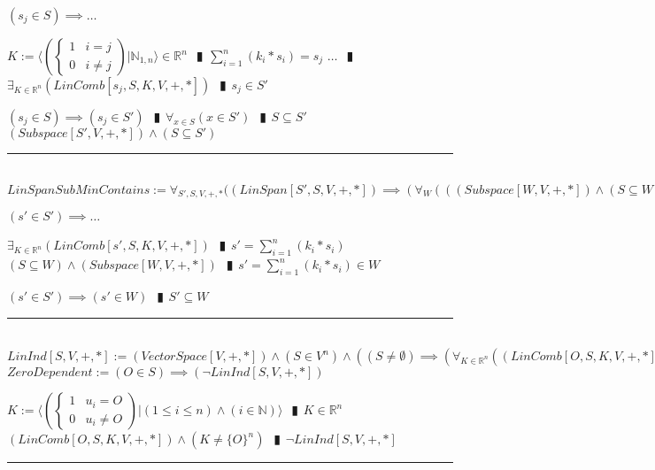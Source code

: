 \documentclass{book}
\newcommand{\abr}{:=}
\newcommand{\pipe}{$\phantom{(}\vrectangleblack\phantom{)}$}
\begin{document}
\begin{enumerate}
  \lit $(s_j \in S) \implies \ldots$
  \begin{enumerate}
    \lit $K \abr \langle \left(\begin{cases} 
      1 & i = j \\
      0 & i \neq j 
    \end{cases}\right) | \mathbb{N}_{1, n} \rangle \in \mathbb{R}^n$ \pipe $\sum_{i = 1}^{n}(k_i * s_i) = s_j$
    \lit $\ldots$ \pipe $\exists_{K \in \mathbb{R}^n}(LinComb[s_j, S, K, V, +, *])$ \pipe $s_j \in S'$
  \end{enumerate}
  \lit $(s_j \in S) \implies (s_j \in S')$ \pipe $\forall_{x \in S}(x \in S')$ \pipe $S \subseteq S'$
  \lit $(Subspace[S', V, +, *]) \land (S \subseteq S')$
\end{enumerate} \vspace{.75mm} \hrule \vspace{.75mm} \ \\ 

$LinSpanSubMinContains \abr \forall_{S', S, V, +, *}((LinSpan[S', S, V, +, *]) \implies (\forall_{W}(((Subspace[W, V, + ,*]) \land (S \subseteq W)) \implies (S' \subseteq W)))$
\begin{enumerate}
  \lit $(s' \in S') \implies \ldots$
  \begin{enumerate}
    \lit $\exists_{K \in \mathbb{R}^n}(LinComb[s', S, K, V, +, *])$ \pipe $s' = \sum_{i = 1}^{n}(k_i * s_i)$
    \lit $(S \subseteq W) \land (Subspace[W, V, + ,*])$ \pipe $s' = \sum_{i = 1}^{n}(k_i * s_i) \in W$
  \end{enumerate}
  \lit $(s' \in S') \implies (s' \in W)$ \pipe $S' \subseteq W$
\end{enumerate} \vspace{.75mm} \hrule \vspace{.75mm} \ \\ 

$LinInd[S, V, +, *] \abr (VectorSpace[V, +, *]) \land (S \in V^n) \land ((S \neq \emptyset) \implies (\forall_{K \in \mathbb{R}^n}((LinComb[O, S, K, V, +, *]) \implies (K = \{0\}^n))))$ \\

$ZeroDependent \abr (O \in S) \implies (\lnot LinInd[S, V, +, *])$
\begin{enumerate}
  \lit $K \abr \langle \left(\begin{cases} 
      1 & u_i = O \\
      0 & u_i \neq O 
    \end{cases}\right) | (1 \leq i \leq n) \land (i \in \mathbb{N}) \rangle$ \pipe $K \in \mathbb{R}^n$
  \lit $(LinComb[O, S, K, V, +, *]) \land (K \neq \{O\}^n)$ \pipe $\lnot LinInd[S, V, +, *]$
\end{enumerate} \vspace{.75mm} \hrule \vspace{.75mm} \ \\ 
\end{document}
